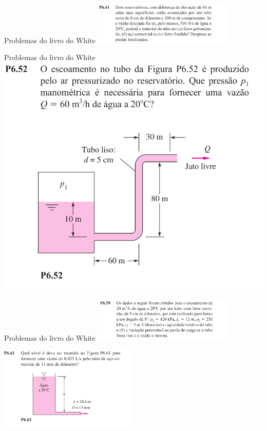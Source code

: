 \documentclass[t,%
brazilian,%
11pt,%
aspectratio=169,%
table%
]{beamer}
\begin{document}

\begin{frame}{Problemas do livro do White}
    \includegraphics[width=0.5\textwidth]{images/Captura de tela de 2025-05-13 17-30-22.png}
\end{frame}

\begin{frame}{Problemas do livro do White}
    \includegraphics[height=\textheight-28pt]{images/Captura de tela de 2025-05-13 16-56-17.png}
\end{frame}

\begin{frame}{Problemas do livro do White}
    \includegraphics[width=0.5\textwidth]{images/p59.png}

    \includegraphics[width=0.5\textwidth]{images/Captura de tela de 2025-05-13 16-07-08.png}
\end{frame}
\end{document}
